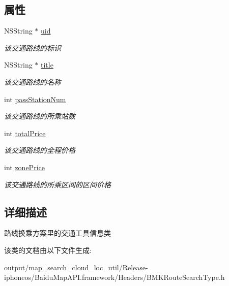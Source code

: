 \subsection*{属性}
\begin{DoxyCompactItemize}
\item 
\hypertarget{interface_b_m_k_vehicle_info_a17283dfe6370d707ab8a8260b5728428}{}N\+S\+String $\ast$ \hyperlink{interface_b_m_k_vehicle_info_a17283dfe6370d707ab8a8260b5728428}{uid}\label{interface_b_m_k_vehicle_info_a17283dfe6370d707ab8a8260b5728428}

\begin{DoxyCompactList}\small\item\em 该交通路线的标识 \end{DoxyCompactList}\item 
\hypertarget{interface_b_m_k_vehicle_info_ad188d1a1f9f87b507098f3190275964e}{}N\+S\+String $\ast$ \hyperlink{interface_b_m_k_vehicle_info_ad188d1a1f9f87b507098f3190275964e}{title}\label{interface_b_m_k_vehicle_info_ad188d1a1f9f87b507098f3190275964e}

\begin{DoxyCompactList}\small\item\em 该交通路线的名称 \end{DoxyCompactList}\item 
\hypertarget{interface_b_m_k_vehicle_info_a328104a4b6f915fe8654325ddd7de287}{}int \hyperlink{interface_b_m_k_vehicle_info_a328104a4b6f915fe8654325ddd7de287}{pass\+Station\+Num}\label{interface_b_m_k_vehicle_info_a328104a4b6f915fe8654325ddd7de287}

\begin{DoxyCompactList}\small\item\em 该交通路线的所乘站数 \end{DoxyCompactList}\item 
\hypertarget{interface_b_m_k_vehicle_info_a2167884d0d65e0f1bfa8b51215f31ba2}{}int \hyperlink{interface_b_m_k_vehicle_info_a2167884d0d65e0f1bfa8b51215f31ba2}{total\+Price}\label{interface_b_m_k_vehicle_info_a2167884d0d65e0f1bfa8b51215f31ba2}

\begin{DoxyCompactList}\small\item\em 该交通路线的全程价格 \end{DoxyCompactList}\item 
\hypertarget{interface_b_m_k_vehicle_info_ac880b4af4c7e2e9f622720e7488ef3c7}{}int \hyperlink{interface_b_m_k_vehicle_info_ac880b4af4c7e2e9f622720e7488ef3c7}{zone\+Price}\label{interface_b_m_k_vehicle_info_ac880b4af4c7e2e9f622720e7488ef3c7}

\begin{DoxyCompactList}\small\item\em 该交通路线的所乘区间的区间价格 \end{DoxyCompactList}\end{DoxyCompactItemize}


\subsection{详细描述}
路线换乘方案里的交通工具信息类 

该类的文档由以下文件生成\+:\begin{DoxyCompactItemize}
\item 
output/map\+\_\+search\+\_\+cloud\+\_\+loc\+\_\+util/\+Release-\/iphoneos/\+Baidu\+Map\+A\+P\+I.\+framework/\+Headers/B\+M\+K\+Route\+Search\+Type.\+h\end{DoxyCompactItemize}
